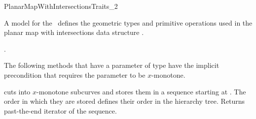 
\ccRefPageBegin

\begin{ccRefConcept}{PlanarMapWithIntersectionsTraits_2}

\ccDefinition
   A model for the \ccRefName\ defines the geometric types and
   primitive operations used in the planar map with intersections data
   structure .

\ccRefines
{} .


\ccTypes

  The following methods that have a parameter of type  have the
  implicit precondition that requires the parameter to be $x$-monotone.

\ccOperations



	 {cuts  into $x$-monotone subcurves and stores them in a
	 sequence starting at . The order in which they are stored
	 defines their order in the hierarchy tree. Returns past-the-end
	 iterator of the sequence.}


\end{ccRefConcept}
